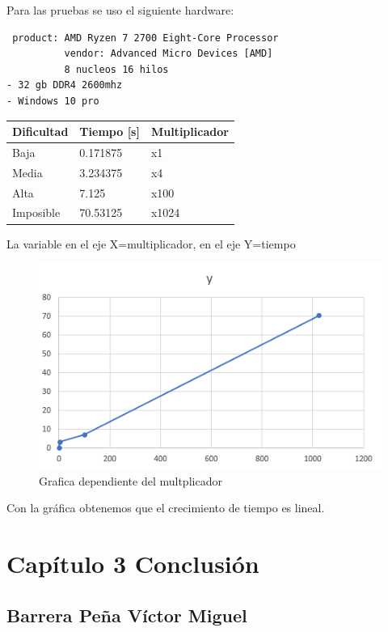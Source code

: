 \documentclass[
  spanish,
]{article}
\begin{document}
Para las pruebas se uso el siguiente hardware:

\begin{verbatim}
 product: AMD Ryzen 7 2700 Eight-Core Processor
          vendor: Advanced Micro Devices [AMD]
          8 nucleos 16 hilos
- 32 gb DDR4 2600mhz
- Windows 10 pro
\end{verbatim}

\begin{longtable}[]{@{}lll@{}}
\toprule
Dificultad & Tiempo {[}s{]} & Multiplicador\tabularnewline
\midrule
\endhead
Baja & 0.171875 & x1\tabularnewline
Media & 3.234375 & x4\tabularnewline
Alta & 7.125 & x100\tabularnewline
Imposible & 70.53125 & x1024\tabularnewline
\bottomrule
\end{longtable}

La variable en el eje X=multiplicador, en el eje Y=tiempo

\begin{figure}
\centering
\includegraphics{img/README/image-20220516004324192.png}
\caption{Grafica dependiente del multplicador}
\end{figure}

Con la gráfica obtenemos que el crecimiento de tiempo es lineal.

\hypertarget{capuxedtulo-3-conclusiuxf3n}{%
\section{Capítulo 3 Conclusión}\label{capuxedtulo-3-conclusiuxf3n}}

\hypertarget{barrera-peuxf1a-vuxedctor-miguel}{%
\subsection{Barrera Peña Víctor
Miguel}\label{barrera-peuxf1a-vuxedctor-miguel}}
\end{document}
